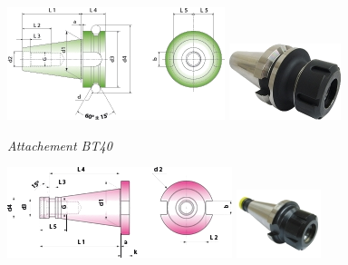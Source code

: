\documentclass[11pt,oneside]{article}
\begin{document}
\vspace{.5cm}

\noindent\begin{center}
\begin{minipage}[c]{.3\linewidth}
\begin{center}
\includegraphics[width=.9\textwidth]{png/cone_1}
\includegraphics[width=.5\textwidth]{png/cone_2}

\textit{Attachement BT40 \cite{attachements}}
\end{center}
\end{minipage}\hfill
\begin{minipage}[c]{.3\linewidth}
\begin{center}
\includegraphics[width=.9\textwidth]{png/cone_3}
\includegraphics[width=.5\textwidth]{png/cone_4}


\end{center}
\end{minipage}
\end{center}
\end{document}

